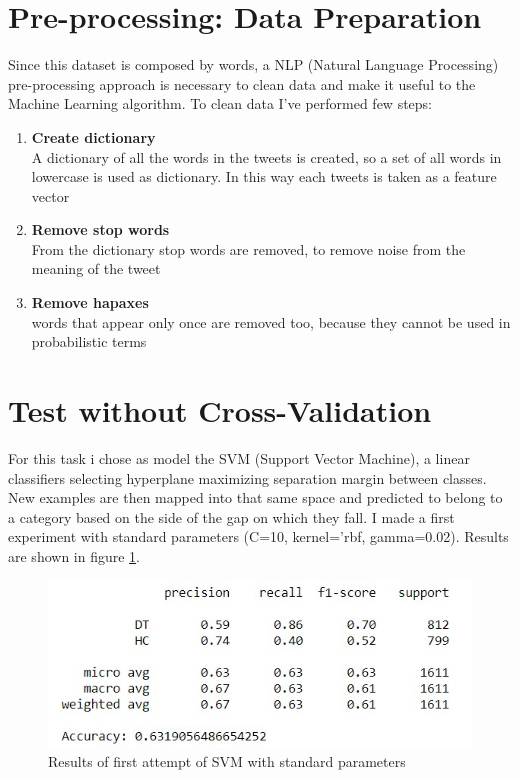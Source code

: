 \documentclass{article}
\begin{document}
\section{Pre-processing: Data Preparation}
Since this dataset is composed by words, a NLP (Natural Language Processing) pre-processing approach is necessary to clean data and make it useful to the Machine Learning algorithm. To clean data I've performed few steps:
\begin{enumerate}
    \item \textbf{Create dictionary} \\ A dictionary of all the words in the tweets is created, so a set of all words in lowercase is used as dictionary. In this way each tweets is taken as a feature vector
    \item \textbf{Remove stop words} \\
    From the dictionary stop words are removed, to remove noise from the meaning of the tweet
    \item \textbf{Remove hapaxes} \\
    words that appear only once are removed too, because they cannot be used in probabilistic terms
\end{enumerate}

\section{Test without Cross-Validation}
For this task i chose as model the SVM (Support Vector Machine), a linear classifiers selecting hyperplane maximizing separation margin between classes. New examples are then mapped into that same space and predicted to belong to a category based on the side of the gap on which they fall.
I made a first experiment with standard parameters (C=10, kernel='rbf, gamma=0.02). 
Results are shown in figure \ref{fig:first_results}.

\begin{figure}[ht]
  \includegraphics[width=\linewidth]{images/first_attempt_results.jpg}
  \caption{Results of first attempt of SVM with standard parameters}
  \label{fig:first_results}
\end{figure}
\end{document}
